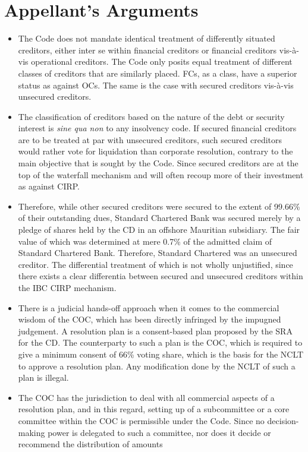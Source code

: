 \documentclass[12pt]{article}
\begin{document}
\section*{Appellant's Arguments}
\begin{itemize}
	\item The Code does not mandate identical treatment of differently situated creditors, either inter se within financial creditors or financial creditors vis-à-vis operational creditors. The Code only posits equal treatment of different classes of creditors that are similarly placed. FCs, as a class, have a superior status as against OCs. The same is the case with secured creditors vis-à-vis unsecured creditors.
	\item The classification of creditors based on the nature of the debt or security interest is \textit{sine qua non} to any insolvency code. If secured financial creditors are to be treated at par with unsecured creditors, such secured creditors would rather vote for liquidation than corporate resolution, contrary to the main objective that is sought by the Code. Since secured creditors are at the top of the waterfall mechanism and will often recoup more of their investment as against CIRP.
	\item Therefore, while other secured creditors were secured to the extent of 99.66\% of their outstanding dues, Standard Chartered Bank was secured merely by a pledge of shares held by the CD in an offshore Mauritian subsidiary. The fair value of which was determined at mere 0.7\% of the admitted claim of Standard Chartered Bank. Therefore, Standard Chartered was an unsecured creditor. The differential treatment of which is not wholly unjustified, since there exists a clear differentia between secured and unsecured creditors within the IBC CIRP mechanism.
	\item There is a judicial hands-off approach when it comes to the commercial wisdom of the COC, which has been directly infringed by the impugned judgement. A resolution plan is a consent-based plan proposed by the SRA for the CD. The counterparty to such a plan is the COC, which is required to give a minimum consent of 66\% voting share, which is the basis for the NCLT to approve a resolution plan. Any modification done by the NCLT of such a plan is illegal.
	\item The COC has the jurisdiction to deal with all commercial aspects of a resolution plan, and in this regard, setting up of a subcommittee or a core committee within the COC is permissible under the Code. Since no decision-making power is delegated to such a committee, nor does it decide or recommend the distribution of amounts

\end{itemize}
\end{document}
